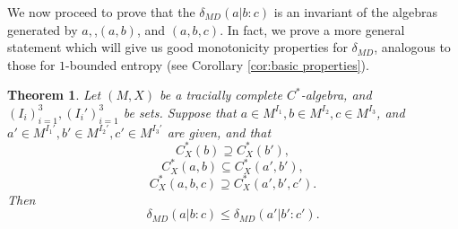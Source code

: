\documentclass[10pt]{amsart}
\newtheorem{thm}{Theorem}[section]
\theoremstyle{definition}
\numberwithin{equation}{section}
\newcommand{\bC}{{\mathbb C}}
\newcommand{\bM}{{\mathbb M}}
\newcommand{\bN}{{\mathbb N}}
\DeclareMathOperator{\tr}{tr}
\DeclareMathOperator{\Ball}{Ball}
\DeclareMathOperator{\Lip}{Lip}
\DeclarePairedDelimiter{\ip}{\langle}{\rangle}
\begin{document}



    

We now proceed to prove that the $\delta_{MD}(a|b:c)$ is an invariant of the algebras generated by $a,$,$(a,b)$, and $(a,b,c)$. In fact, we prove a more general statement which will give us good monotonicity properties for $\delta_{MD}$, analogous to those for $1$-bounded entropy (see Corollary \ref{cor:basic properties}).

\begin{thm}\label{thm: invariance of MD}
Let $(M,X)$ be a tracially complete $C^{*}$-algebra, and $(I_{i})_{i=1}^{3},(I_{i}')_{i=1}^{3}$ be sets. Suppose that $a\in M^{I_{1}},b\in M^{I_{2}},c\in M^{I_{3}}$, and $a'\in M^{I_{1}'},b'\in M^{I_{2}'},c'\in M^{I_{3}'}$ are given, and that 
\[C^{*}_{X}(b)\supseteq C^{*}_{X}(b'),\]
\[C^{*}_{X}(a,b)\subseteq C^{*}_{X}(a',b'),\]
\[C^{*}_{X}(a,b,c)\supseteq C^{*}_{X}(a',b',c').\]
Then
\[\delta_{MD}(a|b:c)\leq\delta_{MD}(a'|b':c').\]
\end{thm}
\end{document}
